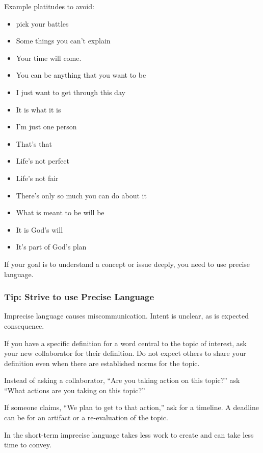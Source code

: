 Example platitudes to avoid:
\begin{itemize}
    \item pick your battles
    \item Some things you can't explain
    \item Your time will come.
    \item You can be anything that you want to be
    \item I just want to get through this day
    \item It is what it is
    \item I'm just one person
    \item That's that
    \item Life's not perfect
    \item Life's not fair
    \item There's only so much you can do about it
    \item What is meant to be will be
    \item It is God's will
    \item It's part of God's plan
\end{itemize}

If your goal is to understand a concept or issue deeply, you need to use precise language.

\subsubsection{Tip: Strive to use Precise Language}

Imprecise language causes miscommunication. Intent is unclear, as is expected consequence.

If you have a specific definition for a word central to the topic of interest, ask your new collaborator for their definition. Do not expect others to share your definition even when there are established norms for the topic. 

Instead of asking a collaborator, ``Are you taking action on this topic?'' ask ``What actions are you taking on this topic?''

If someone claims, ``We plan to get to that action,'' ask for a timeline. A deadline can be for an artifact or a re-evaluation of the topic.

In the short-term imprecise language takes less work to create and can take less time to convey. 

